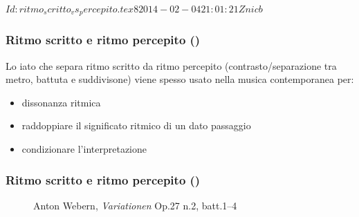 %
%
\svnInfo $Id: ritmo_scritto_vs_percepito.tex 8 2014-02-04 21:01:21Z nicb $

\setcounter{ms}{0}
\begin{frame}
    \frametitle{Ritmo scritto e ritmo percepito ()}

    Lo iato che separa ritmo scritto da ritmo percepito
    (contrasto/separazione tra metro, battuta e suddivisone)
    viene spesso usato nella musica contemporanea per:

    \begin{itemize}

        \item dissonanza ritmica

        \item raddoppiare il significato ritmico di un dato passaggio

        \item condizionare l'interpretazione

    \end{itemize}

\end{frame}

\begin{frame}
    \frametitle{Ritmo scritto e ritmo percepito ()}

    \begin{center}
        \begin{figure}
            \caption{Anton Webern, \emph{Variationen} Op.27 n.2, batt.1--4}
        \end{figure}
    \end{center}

\end{frame}

